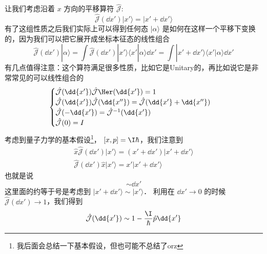 让我们考虑沿着 $x$ 方向的平移算符 $\hat{\mathcal J}$: 
\begin{equation}
\hat{\mathcal{J}}(\dd{x'})|x'\rangle = |x'+\dd{x'}\rangle
\end{equation}
有了这组性质之后我们实际上可以得到任何态 $|\alpha\rangle$ 是如何在这样一个平移下变换的，因为我们可以把它展开成坐标本征态的线性组合
\begin{equation}
\hat{\mathcal{J}}(\dd{x'})|\alpha\rangle = \int\hat{\mathcal{J}}(\dd{x'})|x'\rangle\langle x'|\alpha\rangle \dd{x'} = \int|x'+\dd{x'}\rangle\langle x'|\alpha\rangle \dd{x'}
\end{equation}
有几点值得注意：这个算符满足很多性质，比如它是Unitary的，再比如说它是非常常见的可以线性组合的
\begin{equation}
\begin{cases}
\hat{\mathcal{J}}(\dd{x'})\hat{\mathcal{J}}\Her (\dd{x'}) = 1\\
\hat{\mathcal{J}}(\dd{x'})\hat{\mathcal{J}}(\dd{x''}) = \hat{\mathcal{J}}(\dd{x'} + \dd{x''})\\
\hat{\mathcal{J}}(-\dd{x'}) = \hat{\mathcal{J}}^{-1}(\dd{x'})\\
\hat{\mathcal{J}}(0) = I
\end{cases}
\end{equation}
考虑到量子力学的基本假设\footnote{我后面会总结一下基本假设，但也可能不总结了orz}， $[x,p] = \I\hbar$，我们注意到
\begin{gather}
\hat{x}\hat{\mathcal{J}}(\dd{x'})|x'\rangle = (x'+\dd{x'})|x'+\dd{x'}\rangle\\
\hat{\mathcal{J}}(\dd{x'})\hat{x}|x'\rangle = x'|x'+\dd{x'}\rangle
\end{gather}
也就是说
\begin{equation}
[\hat{x},\hat{\mathcal{J}}(\dd{x'})] \sim \dd{x'}
\end{equation}
这里面的约等于号是考虑到 $|x'+\dd{x'}\rangle \sim |x'\rangle$． 利用在 $\dd{x'}\rightarrow0$ 的时候 $\hat{\mathcal{J}}(\dd{x'})\rightarrow1$，我们得到
\begin{equation}
\hat{\mathcal{J}}(\dd{x'}) \sim 1-\frac{\I}{\hbar}\hat{p}\dd{x'}
\end{equation}

